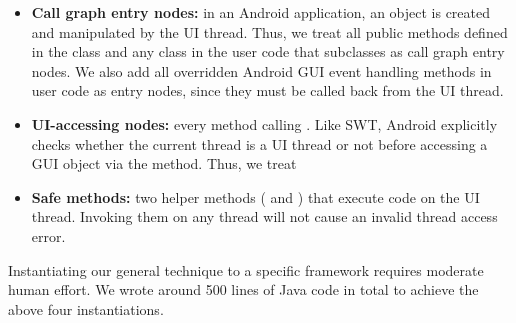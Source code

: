 \begin{itemize}

\item \textbf{Call graph entry nodes: }in an Android application,
an  object is created and manipulated by the UI thread. Thus, we treat
all public methods defined in the  class 
and any class in the user code that subclasses  as call graph entry nodes.
We also add all overridden Android GUI event handling methods in user
code as entry nodes, since they must be called back from the UI thread.

\item \textbf{UI-accessing nodes: }every method calling .
Like SWT, Android explicitly checks whether
the current thread is a UI thread or not before accessing a GUI object via
the  method.
Thus, we treat 

\item \textbf{Safe methods: } two helper methods (
and ) that execute code on the UI thread. 
Invoking them on any thread will not cause an invalid thread access error.

\end{itemize}


Instantiating our general technique to  a specific framework
requires moderate human effort. We wrote around 500 lines of Java code in total to achieve
the above four instantiations.
